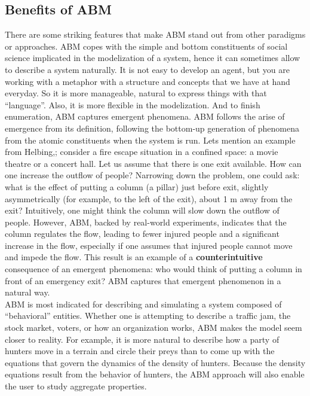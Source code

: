 \documentclass{report}
\begin{document}
\subsection{Benefits of ABM}
There are  some striking features that make ABM stand out from other paradigms or approaches. ABM copes with the simple and bottom constituents of social science implicated in the modelization of a system, hence it can sometimes allow to describe a system naturally. It is not easy to develop an agent, but you are working with a metaphor  with a structure and concepts that we have at hand everyday. So it is more manageable, natural to express things with that “language”. Also, it is more flexible in the modelization. And to finish enumeration, ABM captures emergent phenomena. ABM follows the arise of emergence from its definition, following the bottom-up generation of phenomena from the atomic constituents when the system is run.
Lets mention an example from Helbing,\cite{Helbing2000}; consider a fire escape situation in a confined space: a movie theatre or a concert hall. Let us assume that there is one exit available. How can one increase the outflow of people? Narrowing down the problem, one could ask: what is the effect of putting a column (a pillar) just before exit, slightly asymmetrically (for example, to the left of the exit), about 1 m away from the exit? Intuitively, one might think the column will slow down the outflow of people. However, ABM, backed by real-world experiments, indicates that the column regulates the flow, leading to fewer injured people and a significant increase in the flow, especially if one assumes that injured people cannot move and impede the flow. This result is an example of a \textbf{counterintuitive} consequence of an emergent phenomena: who would think of putting a column in front of an emergency exit? ABM captures that emergent phenomenon in a natural way.\\

ABM is most indicated for describing and simulating a system composed of “behavioral” entities. Whether one is attempting to describe a traffic jam, the stock market, voters, or how an organization works, ABM makes the model seem closer to reality. For example, it is more natural to describe how a party of hunters move in a terrain and circle their preys than to come up with the equations that govern the dynamics of the density of hunters. Because the density equations result from the behavior of hunters, the ABM approach will also enable the user to study aggregate properties.  
\end{document}
